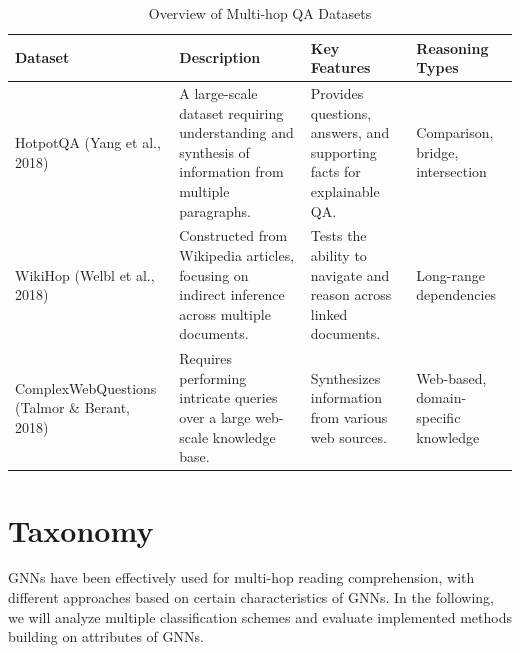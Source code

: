 \documentclass[sigplan,screen,nonacm]{acmart}
\begin{document}
\begin{table}[ht]
  \centering
  \begin{tabular}{|p{4cm}|p{4cm}|p{4cm}|p{4cm}|}
  \hline
  \textbf{Dataset} & \textbf{Description} & \textbf{Key Features} & \textbf{Reasoning Types} \\ \hline
  HotpotQA (Yang et al., 2018) & A large-scale dataset requiring understanding and synthesis of information from multiple paragraphs. & Provides questions, answers, and supporting facts for explainable QA. & Comparison, bridge, intersection \\ \hline
  WikiHop (Welbl et al., 2018) & Constructed from Wikipedia articles, focusing on indirect inference across multiple documents. & Tests the ability to navigate and reason across linked documents. & Long-range dependencies \\ \hline
  ComplexWebQuestions (Talmor \& Berant, 2018) & Requires performing intricate queries over a large web-scale knowledge base. & Synthesizes information from various web sources. & Web-based, domain-specific knowledge \\ \hline
  \end{tabular}
  \caption{Overview of Multi-hop QA Datasets}
  \label{table:multihop_datasets}
  \end{table}
  
  
\section{Taxonomy}
GNNs have been effectively used for multi-hop reading comprehension, with different approaches based on certain characteristics of GNNs. In
the following, we will analyze multiple classification schemes and evaluate implemented methods building on attributes of GNNs. 
\end{document}
